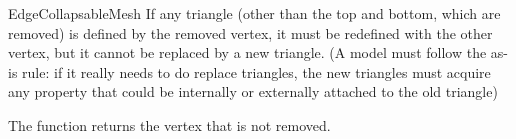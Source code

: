 \begin{ccRefConcept}{EdgeCollapsableMesh}
If any triangle (other than the top and bottom, which are removed) is defined by
the removed vertex, it must be redefined with the other vertex, but it cannot
be replaced by a new triangle. (A model must follow the as-is rule: if it really
needs to do replace triangles, the new triangles must acquire any property 
that could be internally or externally attached to the old triangle)

The function returns the vertex that is not removed.

\ccHasModels
{}\\
\\

\end{ccRefConcept}

